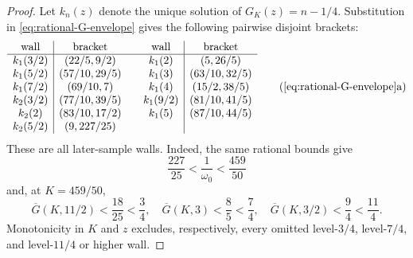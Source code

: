 \documentclass[11pt]{article}
\theoremstyle{remark}
\begin{document}
\begin{proof}
Let $k_n(z)$ denote the unique solution of
$G_K(z)=n-1/4$.  Substitution in
\eqref{eq:rational-G-envelope} gives the following pairwise disjoint
brackets:
\[
\begin{array}{c|c@{\qquad}c|c}
\text{wall}&\text{bracket}&\text{wall}&\text{bracket}\\ \hline
k_1(3/2)&(22/5,9/2)&k_1(2)&(5,26/5)\\
k_1(5/2)&(57/10,29/5)&k_1(3)&(63/10,32/5)\\
k_1(7/2)&(69/10,7)&k_1(4)&(15/2,38/5)\\
k_2(3/2)&(77/10,39/5)&k_1(9/2)&(81/10,41/5)\\
k_2(2)&(83/10,17/2)&k_1(5)&(87/10,44/5)\\
k_2(5/2)&(9,227/25)&&
\end{array}
\tag{\ref{eq:rational-G-envelope}a}
\]
These are all later-sample walls.  Indeed, the same rational bounds give
\[
 \frac{227}{25}<\frac1{\omega_0}<\frac{459}{50}
\]
and, at $K=459/50$,
\[
 \overline G(K,11/2)<\frac{18}{25}<\frac34,
 \quad
 \overline G(K,3)<\frac85<\frac74,
 \quad
 \overline G(K,3/2)<\frac94<\frac{11}{4}.
\]
Monotonicity in $K$ and $z$ excludes, respectively, every omitted
level-$3/4$, level-$7/4$, and level-$11/4$ or higher wall.


\end{proof}
\end{document}

